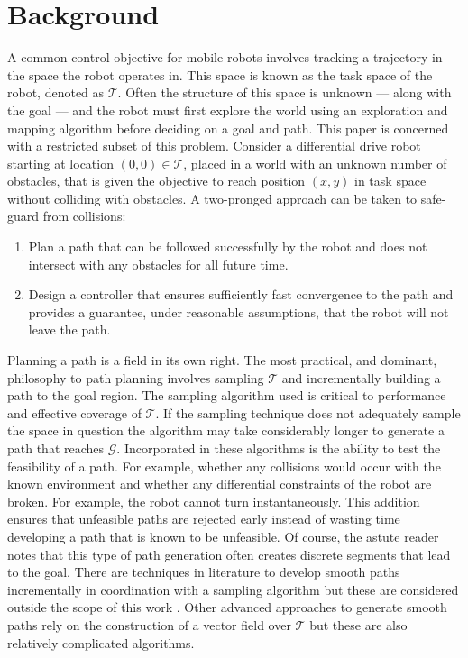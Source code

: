 \documentclass[oneside, 11pt]{book}
\begin{document}
\section{Background}
A common control objective for mobile robots involves tracking a trajectory in the space the robot operates in. This space is known as the task space of the robot, denoted as $\mathcal{T}$. Often the structure of this space is unknown --- along with the goal --- and the robot must first explore the world using an exploration and mapping algorithm before deciding on a goal and path.  This paper is concerned with a restricted subset of this problem. Consider a differential drive robot starting at location $(0,0)\in\mathcal{T}$, placed in a world with an unknown number of obstacles, that is given the objective to reach position $(x,y)$ in task space without colliding with obstacles. A two-pronged approach can be taken to safe-guard from collisions:
\begin{enumerate}
    \item Plan a path that can be followed successfully by the robot and does not intersect with any obstacles for all future time.
    \item Design a controller that ensures sufficiently fast convergence to the path and provides a guarantee, under reasonable assumptions, that the robot will not leave the path.
\end{enumerate}

Planning a path is a field in its own right. The most practical, and dominant, philosophy to path planning involves sampling $\mathcal{T}$ and incrementally building a path to the goal region. The sampling algorithm used is critical to performance and effective coverage of $\mathcal{T}$. If the sampling technique does not adequately sample the space in question the algorithm may take considerably longer to generate a path that reaches $\mathcal{G}$. Incorporated in these algorithms is the ability to test the feasibility of a path. For example, whether any collisions would occur with the known environment and whether any differential constraints of the robot are broken. For example, the robot cannot turn instantaneously. This addition ensures that unfeasible paths are rejected early instead of wasting time developing a path that is known to be unfeasible. Of course, the astute reader notes that this type of path generation often creates discrete segments that lead to the goal. There are techniques in literature to develop smooth paths incrementally in coordination with a sampling algorithm but these are considered outside the scope of this work \cite{Yang14}. Other advanced approaches to generate smooth paths rely on the construction of a vector field over $\mathcal{T}$ \cite{LaValle06} but these are also relatively complicated algorithms.
\end{document}
